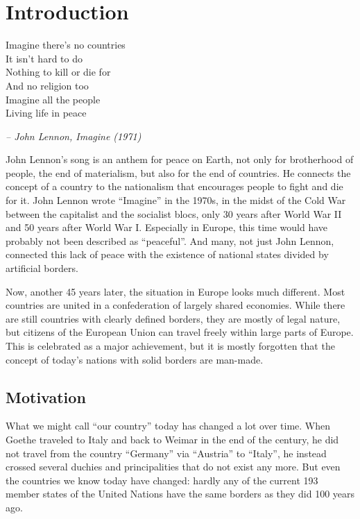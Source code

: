 
\chapter{Introduction} %
\label{cha:introduction}
\begin{large}
\begin{quoteit}
  Imagine there's no countries \\
  It isn't hard to do \\
  Nothing to kill or die for \\
  And no religion too \\
  Imagine all the people \\
  Living life in peace
\end{quoteit}
\end{large}
\hfill \textit{-- John Lennon, \emph{Imagine} (1971)}

John Lennon's song is an anthem for peace on Earth, not only for brotherhood of people, the end of materialism, but also for the end of countries. He connects the concept of a country to the nationalism that encourages people to fight and die for it. John Lennon wrote ``Imagine'' in the 1970s, in the midst of the Cold War between the capitalist and the socialist blocs, only 30 years after World War II and 50 years after World War I. Especially in Europe, this time would have probably not been described as ``peaceful''. And many, not just John Lennon, connected this lack of peace with the existence of national states divided by artificial borders.

Now, another 45 years later, the situation in Europe looks much different. Most countries are united in a confederation of largely shared economies. While there are still countries with clearly defined borders, they are mostly of legal nature, but citizens of the European Union can travel freely within large parts of Europe.
This is celebrated as a major achievement, but it is mostly forgotten that the concept of today's nations with solid borders are man-made.



\section{Motivation} %
\label{sec:motivation}

What we might call ``our country'' today has changed a lot over time. When Goethe traveled to Italy and back to Weimar in the end of the  century, he did not travel from the country ``Germany'' via ``Austria'' to ``Italy'', he instead crossed several duchies and principalities that do not exist any more. But even the countries we know today have changed: hardly any of the current 193 member states of the United Nations have the same borders as they did 100 years ago.

